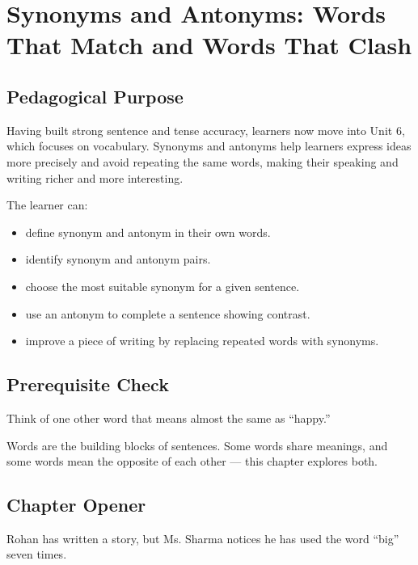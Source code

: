 
\chapter{Synonyms and Antonyms: Words That Match and Words That Clash}

\section{Pedagogical Purpose}
Having built strong sentence and tense accuracy, learners now move into Unit 6, which focuses on vocabulary. Synonyms and antonyms help learners express ideas more precisely and avoid repeating the same words, making their speaking and writing richer and more interesting.

\begin{learningobjectives}
The learner can:
\begin{itemize}
    \item define synonym and antonym in their own words.
    \item identify synonym and antonym pairs.
    \item choose the most suitable synonym for a given sentence.
    \item use an antonym to complete a sentence showing contrast.
    \item improve a piece of writing by replacing repeated words with synonyms.
\end{itemize}
\end{learningobjectives}

\section{Prerequisite Check}
\begin{quickcheck}
Think of one other word that means almost the same as ``happy.''
\end{quickcheck}

\begin{rememberbox}
Words are the building blocks of sentences. Some words share meanings, and some words mean the opposite of each other --- this chapter explores both.
\end{rememberbox}

\section{Chapter Opener}
Rohan has written a story, but Ms. Sharma notices he has used the word ``big'' seven times.

